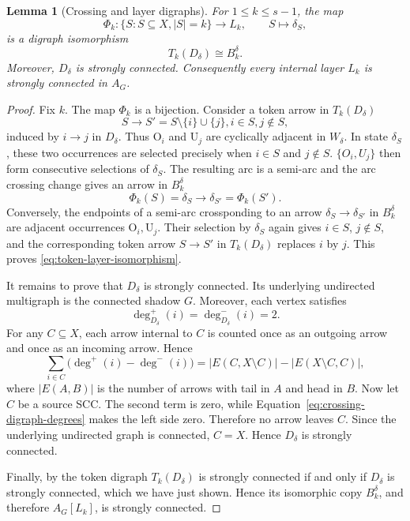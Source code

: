 \documentclass[11pt]{amsart}
\newtheorem{lemma}[theorem]{Lemma}
\theoremstyle{definition}
\theoremstyle{remark}
\begin{document}
\begin{lemma}[Crossing and layer digraphs]\label{lem:strong-layers}
For \(1\le k\le s-1\), the map
\[
  \Phi_k:\{ S : S\subseteq X, |S|=k \} \longrightarrow L_k,
  \qquad S\longmapsto\delta_S,
\]
is a digraph isomorphism
\begin{equation}\label{eq:token-layer-isomorphism}
  T_k(D_\delta)\cong B_k^\delta.
\end{equation}
Moreover, \(D_\delta\) is strongly connected.  Consequently every internal
layer \(L_k\) is strongly connected in \(A_G\).
\end{lemma}

\begin{proof}
Fix \(k\).  The map \(\Phi_k\) is a bijection.  Consider a token arrow in $T_k(D_\delta)$
\[
  S\longrightarrow S'=S\setminus\{i\}\cup\{j\}, i\in S, j\notin S, 
\]
induced by \(i\to j\) in \(D_\delta\).  Thus \(\mathrm O_i\) and
\(\mathrm U_j\) are cyclically adjacent in \(W_\delta\).  In state \(\delta_S\), these two
occurrences are selected precisely when \(i\in S\) and \(j\notin S\).
\(\{O_i, U_j\}\) then form consecutive selections of \(\delta_S\).  The resulting  arc is a semi-arc and the arc crossing change gives an arrow in  \(B_k^\delta\) 
\[
  \Phi_k(S)=\delta_S\longrightarrow\delta_{S'}=\Phi_k(S').
\]
Conversely, the endpoints of a semi-arc crossponding to an arrow \(\delta_S\to \delta_{S'}\) in \(B_k^\delta\) are adjacent
occurrences \(\mathrm O_i,\mathrm U_j\).  Their selection by \(\delta_S\) again gives
\(i\in S\), \(j\notin S\), and the corresponding token arrow \(S\to S'\) in \(T_k(D_{\delta})\) replaces
\(i\) by \(j\).  This proves \eqref{eq:token-layer-isomorphism}.

It remains to prove that \(D_\delta\) is strongly connected.  Its underlying
undirected multigraph is the connected shadow \(G\).  Moreover, each vertex
satisfies
\begin{equation}\label{eq:crossing-digraph-degrees}
  \deg^+_{D_\delta}(i)=\deg^-_{D_\delta}(i)=2.
\end{equation}
For any
\(C\subseteq X\), each arrow internal to \(C\) is counted once as an
outgoing arrow and once as an incoming arrow.  Hence
\[
  \sum_{i\in C}\bigl(\deg^+(i)-\deg^-(i)\bigr)
  =|E(C,X\setminus C)|-|E(X\setminus C,C)|,
\]
where \(|E(A,B)|\) is the number of arrows with tail in \(A\) and head
in \(B\).
Now let \(C\) be a source SCC.  The second term is zero, while
Equation~\eqref{eq:crossing-digraph-degrees} makes the left side zero.
Therefore no arrow leaves \(C\).  Since the underlying undirected graph is
connected, \(C=X\). Hence \(D_\delta\) is strongly connected.

Finally, by \cite[Corollary~3.4]{FernandesEtAl2026} the token digraph
\(T_k(D_\delta)\) is strongly connected if and only if \(D_\delta\) is
strongly connected, which we have just shown.  Hence its isomorphic copy
\(B_k^\delta\), and therefore \(A_G[L_k]\), is strongly connected.
\end{proof}
\end{document}
